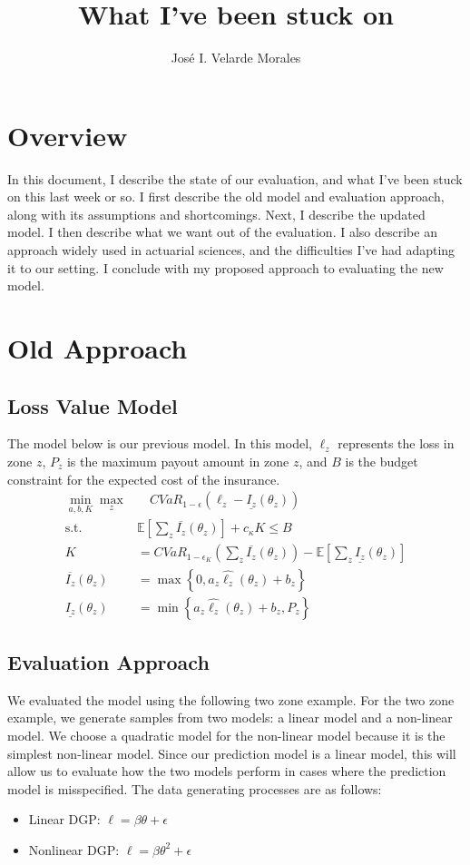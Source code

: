 \documentclass[11pt]{article}
\title{What I've been stuck on}
\author{José I. Velarde Morales}
\begin{document}
\maketitle   

\section{Overview}
In this document, I describe the state of our evaluation, and what I've been stuck on this last week or so. I first describe the old model and evaluation approach, along with its assumptions and shortcomings. Next, I describe the updated model. I then describe what we want out of the evaluation. I also describe an approach widely used in actuarial sciences, and the difficulties I've had adapting it to our setting. I conclude with my proposed approach to evaluating the new model. 

\section{Old Approach}
  \subsection{Loss Value Model}
  The model below is our previous model. In this model, $\ell_z$ represents the loss in zone $z$, $P_z$ is the maximum payout amount in zone $z$, and $B$ is the budget constraint for the expected cost of the insurance. 
    \begin{align}
      \min_{a,b,K} \max_z &\quad CVaR_{1-\epsilon}\left (\ell_z - \underline{I_z}(\theta_z) \right )\\
      \text{s.t.   } & \mathbb{E}\left [ \sum_z \overline{I_z}(\theta_z) \right ] +  c_{\kappa} K \leq B\\
      K &= CVaR_{1-\epsilon_K} \left( \sum_z \overline{I_z}(\theta_z) \right ) - \mathbb{E}\left [ \sum_z \underline{I_z}(\theta_z ) \right ] \\
      \overline{I_z}(\theta_z) &= \max \left \{0, a_z \hat{\ell_z}(\theta_z)+b_z \right \}\\
      \underline{I_z}(\theta_z) &= \min \left \{ a_z \hat{\ell_z}(\theta_z)+b_z,P_z \right \}
    \end{align}

  \subsection{Evaluation Approach}
  We evaluated the model using the following two zone example. For the two zone example, we generate samples from two models: a linear model and a non-linear model. We choose a quadratic model for the non-linear model because it is the simplest non-linear model. Since our prediction model is a linear model, this will allow us to evaluate how the two models perform in cases where the prediction model is misspecified. The data generating processes are as follows: 
      \begin{itemize}
        \item Linear DGP: $\ell = \beta \theta + \epsilon$
        \item Nonlinear DGP: $\ell = \beta \theta^2 + \epsilon$
      \end{itemize}
\end{document}

